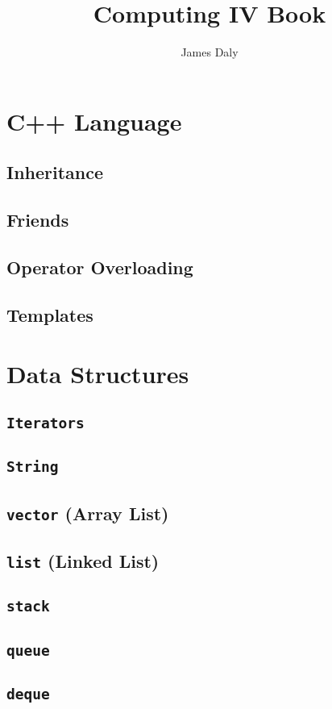 \documentclass[letterpaper,10pt]{book}
\title{Computing IV Book}
\author{James Daly}
\newcommand{\code}[1]{\texttt{#1}}
\begin{document}
\maketitle

\tableofcontents

\part{C++ Language}

\chapter{Inheritance}
\chapter{Friends}
\chapter{Operator Overloading}
\chapter{Templates}

\part{Data Structures}
\chapter{\code{Iterators}}
\chapter{\code{String}}
\chapter{\code{vector} (Array List)}
\chapter{\code{list} (Linked List)}
\chapter{\code{stack}}
\chapter{\code{queue}}
\chapter{\code{deque}}
\end{document}
